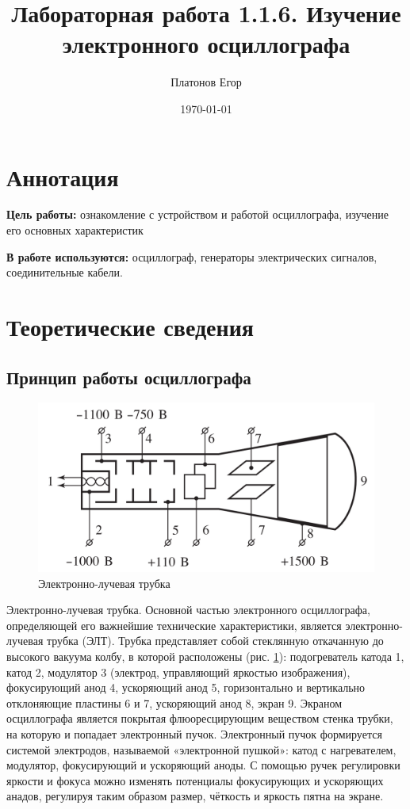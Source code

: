 \documentclass[a4paper, 12pt]{article}
\title{Лабораторная работа 1.1.6. Изучение электронного осциллографа}
\author{Платонов Егор}
\date{\today}
\begin{document}
	
\maketitle

\section{Аннотация}

\textbf{Цель работы:} ознакомление с устройством и работой осциллографа, изучение его основных характеристик

\textbf{В работе используются:} осциллограф, генераторы электрических сигналов, соединительные кабели.

\section{Теоретические сведения}
\subsection{Принцип работы осциллографа}
\begin{figure}[h]
    \centering
    \includegraphics[scale=0.7]{oscilloscope.png}
    \caption{Электронно-лучевая трубка}
    \label{fig:oscilloscope}
\end{figure}

Электронно-лучевая трубка. Основной частью электронного осциллографа, определяющей его важнейшие технические характеристики, является электронно-лучевая трубка (ЭЛТ). Трубка представляет собой стеклянную откачанную до высокого вакуума колбу, в которой расположены (рис. \ref{fig:oscilloscope}): подогреватель катода 1, катод 2, модулятор 3 (электрод, управляющий яркостью изображения), фокусирующий анод 4, ускоряющий анод 5, горизонтально и вертикально отклоняющие пластины 6 и 7, ускоряющий анод 8, экран 9.
Экраном осциллографа является покрытая флюоресцирующим веществом стенка трубки, на которую и попадает электронный пучок.
Электронный пучок формируется системой электродов, называемой
«электронной пушкой»: катод с нагревателем, модулятор, фокусирующий и ускоряющий аноды. С помощью ручек регулировки яркости и фокуса можно изменять потенциалы фокусирующих и ускоряющих
анадов, регулируя таким образом размер, чёткость и яркость пятна на
экране.
\end{document}
